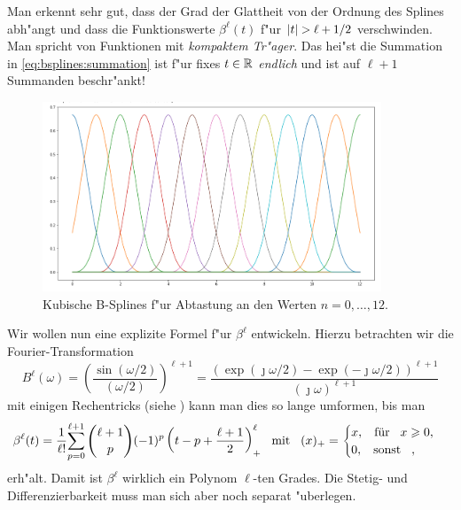 Man erkennt sehr gut, dass der Grad der Glattheit von der Ordnung des Splines abh"angt und dass die Funktionswerte $\beta^\ell(t)$ f"ur ${\left| t \right|}>\ell+1/2$ verschwinden. 
Man spricht von Funktionen mit \emph{kompaktem Tr"ager}. 
Das hei"st die Summation in \eqref{eq:bsplines:summation} ist f"ur fixes $t \in \mathbb{R}$ \emph{endlich} und ist auf $\ell+1$ Summanden beschr"ankt!
%
\begin{figure}
    \centering\includegraphics[width=0.9\textwidth]{img/bsplines/all_splines.png}
    \caption{Kubische B-Splines f"ur Abtastung an den Werten $n = 0, \dots, 12$.}\label{fig:bsplines:all_splines}
\end{figure}
%
Wir wollen nun eine explizite Formel f"ur $\beta^\ell$ entwickeln. Hierzu betrachten wir die Fourier-Transformation 
\begin{equation}
    B^\ell(\omega) 
        = \left(\frac{\sin(\omega / 2)}{(\omega / 2)}\right)^{\ell + 1}
        = \frac{(\exp(\jmath \omega/2) - \exp(-\jmath \omega/2))^{\ell+1}}{
            (\jmath \omega)^{\ell + 1}
        }
\end{equation}
mit einigen Rechentricks (siehe \cite[Box 1.]{unser1999splines_mag}) kann man dies so lange umformen, bis man
\begin{equation}
    \beta^\ell(t) = \frac{1}{\ell !}{\sum\limits_{p = 0}^{\ell+1}{
            \binom{\ell+1}{p}(-1)^p
            \left(t - p + \frac{\ell+1}{2}\right)_+^\ell
        }}
    {\hspace{3mm} \text{mit} \hspace{3mm}}
    (x)_+ = \begin{cases}
      x, {\hspace{3mm} \text{f\"ur} \hspace{3mm}} x \geqslant 0, \\
      0, {\hspace{3mm} \text{sonst} \hspace{3mm}},  
    \end{cases}
\end{equation}
erh"alt. 
Damit ist $\beta^\ell$ wirklich ein Polynom $\ell$-ten Grades. 
Die Stetig- und Differenzierbarkeit muss man sich aber noch separat "uberlegen. 

